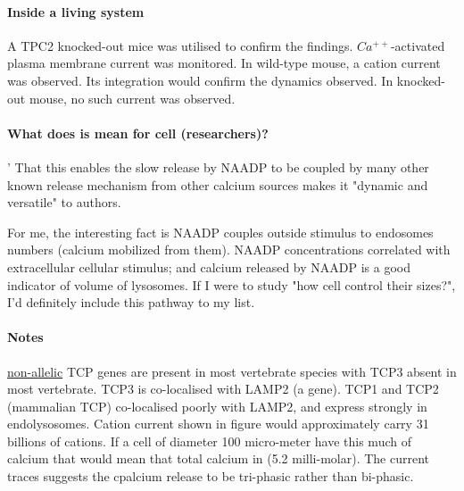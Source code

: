 \documentclass[twocolumn]{article}
\begin{document}
\paragraph{Inside a living system}
A TPC2 knocked-out mice was utilised to confirm the findings.
$Ca^{++}$-activated plasma membrane current was monitored. In wild-type mouse, a
cation current was observed. Its integration would confirm the dynamics
observed. In knocked-out mouse, no such current was observed.

\paragraph{What does is mean for cell (researchers)?}'
That this enables the slow release by NAADP to be coupled by many other known
release mechanism from other calcium sources makes it "dynamic and versatile" to
authors.  

For me, the interesting fact is NAADP couples outside stimulus to endosomes
numbers (calcium mobilized from them).  NAADP concentrations correlated with
extracellular cellular stimulus; and calcium released by NAADP is a good
indicator of volume of lysosomes. If I were to study "how cell control their
sizes?", I'd definitely include this pathway to my list.

\paragraph{Notes}

\href{http://biology.stackexchange.com/questions/10632/whats-a-non-allelic-gene}{non-allelic}
TCP genes are present in most vertebrate species with TCP3 absent in most
vertebrate. TCP3 is co-localised with LAMP2 (a gene). TCP1 and TCP2 (mammalian
TCP) co-localised poorly with LAMP2, and express strongly in endolysosomes.
Cation current shown in figure would approximately carry 31 billions of cations.
If a cell of diameter 100 micro-meter have this much of calcium that would mean
that total calcium in  (5.2 milli-molar).  The current traces suggests the
cpalcium release to be tri-phasic rather than bi-phasic.
\end{document}
